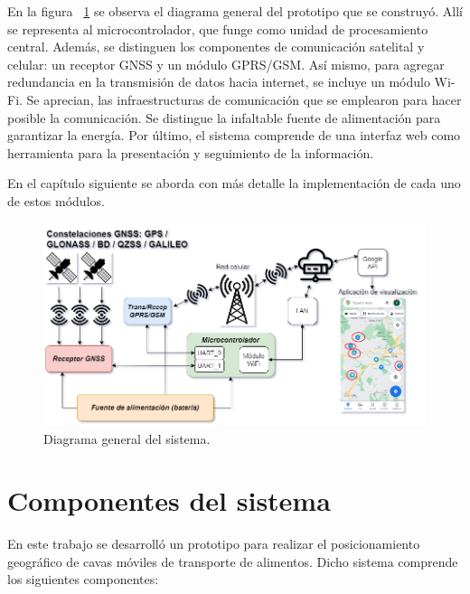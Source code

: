 En la figura ~\ref{fig:diagrama_general} se observa el diagrama general del prototipo que se construyó. Allí se representa al microcontrolador, que funge como unidad de procesamiento central. Además, se distinguen los componentes de comunicación satelital y celular: un receptor GNSS y un módulo GPRS/GSM. Así mismo, para agregar redundancia en la transmisión de datos hacia internet, se incluye un módulo Wi-Fi. Se aprecian, las infraestructuras de comunicación que se emplearon para hacer posible la comunicación. Se distingue la infaltable fuente de alimentación para garantizar la energía. Por último, el sistema comprende de una interfaz web como herramienta para la presentación y seguimiento de la información. 

En el capítulo siguiente se aborda con más detalle la implementación de cada uno de estos módulos.


\vspace{1cm}

\begin{figure}[htbp]
	\centering
	\includegraphics[width=1\textwidth]{./Figures/diagrama_general.png}
	\caption{Diagrama general del sistema.}
	\label{fig:diagrama_general}
\end{figure}



\section{Componentes del sistema}
\label{sec:Componentes_sistema}

En este trabajo se desarrolló un prototipo para realizar el posicionamiento geográfico de cavas móviles de transporte de alimentos. Dicho sistema comprende los siguientes componentes:

